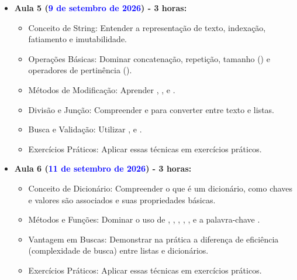 \begin{itemize}
    \item \textbf{Aula 5 (\textcolor{blue}{9 de setembro de 2026}) - 3 horas:}
    \begin{itemize}\justifying
        \item Conceito de String: Entender a representação de texto, indexação, fatiamento e imutabilidade.
        \item Operações Básicas: Dominar concatenação, repetição, tamanho () e operadores de pertinência ().
        \item Métodos de Modificação: Aprender , ,  e .
        \item Divisão e Junção: Compreender  e  para converter entre texto e listas.
        \item Busca e Validação: Utilizar ,  e .
        \item Exercícios Práticos: Aplicar essas técnicas em exercícios práticos.
    \end{itemize}



    \item \textbf{Aula 6 (\textcolor{blue}{11 de setembro de 2026}) - 3 horas:} 
    \begin{itemize}\justifying
       \item Conceito de Dicionário: Compreender o que é um dicionário, como chaves e valores são associados e suas propriedades básicas.
       \item Métodos e Funções: Dominar o uso de , , , , ,  e a palavra-chave .
       \item Vantagem em Buscas: Demonstrar na prática a diferença de eficiência (complexidade de busca) entre listas e dicionários.
      \item Exercícios Práticos: Aplicar essas técnicas em exercícios práticos.

   \end{itemize}


\end{itemize}
